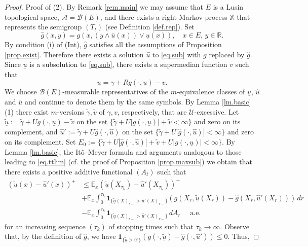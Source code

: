 \documentclass[11pt,a4paper,reqno]{amsart}
\theoremstyle{definition}
\numberwithin{equation}{section}
\begin{document}
\begin{proof}
Proof of  (2). By Remark \ref{rem.main} we may assume that $E$ is a Lusin topological space, 
$\mathcal A=\mathcal B(E)$, and  there exists a right Markov process $\mathbb X$  that represents 
the semigroup $(T_t)$ (see Definition \ref{def.rep}). Set
\[
\hat{g}(x,y)=g(x,(y \wedge \bar{u}(x)) \vee \underline{u}(x)), \quad x \in  E,\, y \in \mathbb{R} .
\]
By condition (i) of (Int), $\hat{g}$ satisfies  all the assumptions of  Proposition \ref{prop.exist}. 
Therefore there exists a solution $\hat{u}$ to \eqref{eq.sub} with $g$ replaced by $\hat{g}$. 
Since $\underline{u}$ is a subsolution to  \eqref{eq.sub}, there exists a supermedian function  $v$ such that
\[
\underline{u}=\gamma+R g(\cdot, \underline{u})-v.
\]
We choose $\mathcal B(E)$-measurable representatives of the $m$-equivalence classes of
$\underline{u}$, $\hat u$ and  $\bar u$ and continue to denote them by the same symbols. By Lemma \ref{lm.basic}(1)
there exist $m$-versions $\tilde \gamma,\tilde v$ of $\gamma,v$, respectively, that are $\mathcal U$-excessive.
Let $\tilde{\underline{u}}:= \tilde \gamma+Ug(\cdot,\underline{u})-\tilde v$ 
on the set $\{\tilde\gamma+U|g(\cdot,\underline{u})|+\tilde v<\infty\}$ 
and zero on its complement, and
$\hat u':= \tilde\gamma+U\hat g(\cdot,\hat u)$ on the set 
$\{\tilde\gamma+U|\hat g(\cdot,\hat u)|<\infty\}$ and zero on its complement.
Set $E_0:=\{\tilde\gamma+U|\hat g(\cdot,\hat u)|+\tilde v+U|g(\cdot,\underline{u})|<\infty\}$.
By Lemma \ref{lm.basic},  the It\^o--Meyer formula 
and   arguments analogous to those leading to \eqref{eq.ttlim} (cf. the proof of Proposition \ref{prop.maxsub})
we obtain that there exists a positive additive functional $(A_t)$ such that 
$$
\begin{aligned}
(\underline{\tilde u}(x)-\hat{u}'(x))^{+} &
\le \mathbb{E}_x\left(\underline{\tilde u}\left(X_{\tau_k}\right)-\hat{u}'\left(X_{\tau_k}\right)\right)^{+}\\&
+\mathbb{E}_x \int_0^{\tau_k} \mathbf{1}_{\{\underline{\tilde u}(X)_{r-}>\hat{u}'(X)_{r-}\}}
\left(g\left(X_r, \underline{\tilde u}\left(X_r\right)\right)-\hat{g}\left(X_r, \hat{u}'\left(X_r\right)\right)\right) \,d r \\
& -\mathbb{E}_x \int_0^{\tau_k} \mathbf{1}_{\{\underline{\tilde u}(X)_{r-}>\hat{u}'(X)_{r-}\}} \,d A_r \quad \text { a.e. }
\end{aligned}
$$
for an increasing sequence $(\tau_k)$ of stopping times such that $\tau_k\to\infty$. 
Observe that, by the definition of $\hat{g}$, we have 
$\mathbf{1}_{\{\underline{\tilde u}>\hat{u}'\}}(g(\cdot, \underline{\tilde u})-\hat{g}(\cdot, \hat{u}')) \leq 0$. Thus,

\end{proof}
\end{document}
